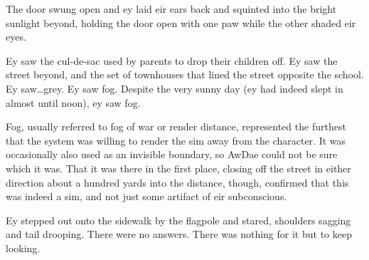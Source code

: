 The door swung open and ey laid eir ears back and squinted into the bright sunlight beyond, holding the door open with one paw while the other shaded eir eyes.

Ey saw the cul-de-sac used by parents to drop their children off.  Ey saw the street beyond, and the set of townhouses that lined the street opposite the school.  Ey saw\ldots{}grey.  Ey saw fog.  Despite the very sunny day (ey had indeed slept in almost until noon), ey saw fog.

Fog, usually referred to fog of war or render distance, represented the furthest that the system was willing to render the sim away from the character.  It was occasionally also used as an invisible boundary, so AwDae could not be sure which it was.  That it was there in the first place, closing off the street in either direction about a hundred yards into the distance, though, confirmed that this was indeed a sim, and not just some artifact of eir subconscious.

Ey stepped out onto the sidewalk by the flagpole and stared, shoulders sagging and tail drooping.  There were no answers.  There was nothing for it but to keep looking.

